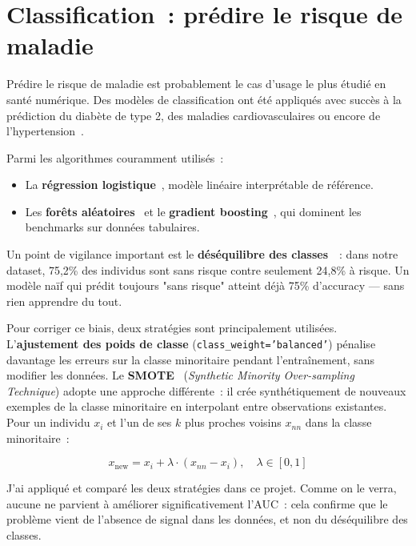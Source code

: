 \section{Classification~: prédire le risque de maladie}

Prédire le risque de maladie est probablement le cas d'usage le plus étudié en santé numérique. Des modèles de classification ont été appliqués avec succès à la prédiction du diabète de type 2, des maladies cardiovasculaires ou encore de l'hypertension~\cite{rajpurkar2022}.

Parmi les algorithmes couramment utilisés~:
\begin{itemize}
  \item La \textbf{régression logistique}~\cite{james2021}, modèle linéaire interprétable de référence.
  \item Les \textbf{forêts aléatoires}~\cite{breiman2001} et le \textbf{gradient boosting}~\cite{chen2016}, qui dominent les benchmarks sur données tabulaires.
\end{itemize}

Un point de vigilance important est le \textbf{déséquilibre des classes}~\cite{japkowicz2002}~: dans notre dataset, 75,2\% des individus sont sans risque contre seulement 24,8\% à risque. Un modèle naïf qui prédit toujours "sans risque" atteint déjà 75\% d'accuracy --- sans rien apprendre du tout.

Pour corriger ce biais, deux stratégies sont principalement utilisées. L'\textbf{ajustement des poids de classe} (\texttt{class\_weight='balanced'}) pénalise davantage les erreurs sur la classe minoritaire pendant l'entraînement, sans modifier les données. Le \textbf{SMOTE}~\cite{chawla2002} (\textit{Synthetic Minority Over-sampling Technique}) adopte une approche différente~: il crée synthétiquement de nouveaux exemples de la classe minoritaire en interpolant entre observations existantes. Pour un individu $x_i$ et l'un de ses $k$ plus proches voisins $x_{nn}$ dans la classe minoritaire~:

\begin{equation}
x_{\text{new}} = x_i + \lambda \cdot (x_{nn} - x_i), \quad \lambda \in [0, 1]
\end{equation}

J'ai appliqué et comparé les deux stratégies dans ce projet. Comme on le verra, aucune ne parvient à améliorer significativement l'AUC~: cela confirme que le problème vient de l'absence de signal dans les données, et non du déséquilibre des classes.

